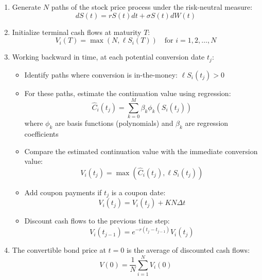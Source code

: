 \begin{enumerate}
    \item Generate $N$ paths of the stock price process under the risk-neutral measure:
    \begin{equation}
        dS(t) = rS(t)dt + \sigma S(t)dW(t)
    \end{equation}
    
    \item Initialize terminal cash flows at maturity $T$:
    \begin{equation}
        V_i(T) = \max(N, \ell S_i(T)) \quad \text{for } i = 1, 2, \ldots, N
    \end{equation}
    
    \item Working backward in time, at each potential conversion date $t_j$:
        \begin{itemize}
            \item Identify paths where conversion is in-the-money: $\ell S_i(t_j) > 0$
            \item For these paths, estimate the continuation value using regression:
            \begin{equation}
                \hat{C}_i(t_j) = \sum_{k=0}^{M} \beta_k \phi_k(S_i(t_j))
            \end{equation}
            where $\phi_k$ are basis functions (polynomials) and $\beta_k$ are regression coefficients
            \item Compare the estimated continuation value with the immediate conversion value:
            \begin{equation}
                V_i(t_j) = \max(\hat{C}_i(t_j), \ell S_i(t_j))
            \end{equation}
            \item Add coupon payments if $t_j$ is a coupon date:
            \begin{equation}
                V_i(t_j) = V_i(t_j) + K N \Delta t
            \end{equation}
            \item Discount cash flows to the previous time step:
            \begin{equation}
                V_i(t_{j-1}) = e^{-r(t_j-t_{j-1})}V_i(t_j)
            \end{equation}
        \end{itemize}
        
    \item The convertible bond price at $t=0$ is the average of discounted cash flows:
    \begin{equation}
        V(0) = \frac{1}{N}\sum_{i=1}^{N}V_i(0)
    \end{equation}
\end{enumerate}

